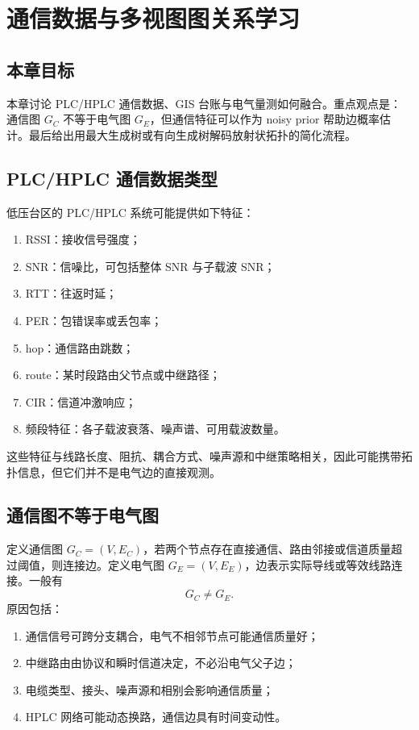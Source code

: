 \chapter{通信数据与多视图图关系学习}
\label{chap:multiview}

\section*{本章目标}
本章讨论 PLC/HPLC 通信数据、GIS 台账与电气量测如何融合。重点观点是：通信图 $G_C$ 不等于电气图 $G_E$，但通信特征可以作为 noisy prior 帮助边概率估计。最后给出用最大生成树或有向生成树解码放射状拓扑的简化流程。

\section{PLC/HPLC 通信数据类型}

低压台区的 PLC/HPLC 系统可能提供如下特征：
\begin{enumerate}[label=(\arabic*)]
  \item RSSI：接收信号强度；
  \item SNR：信噪比，可包括整体 SNR 与子载波 SNR；
  \item RTT：往返时延；
  \item PER：包错误率或丢包率；
  \item hop：通信路由跳数；
  \item route：某时段路由父节点或中继路径；
  \item CIR：信道冲激响应；
  \item 频段特征：各子载波衰落、噪声谱、可用载波数量。
\end{enumerate}
这些特征与线路长度、阻抗、耦合方式、噪声源和中继策略相关，因此可能携带拓扑信息，但它们并不是电气边的直接观测。

\section{通信图不等于电气图}

定义通信图 $G_C=(V,E_C)$，若两个节点存在直接通信、路由邻接或信道质量超过阈值，则连接边。定义电气图 $G_E=(V,E_E)$，边表示实际导线或等效线路连接。一般有
\begin{equation}
  G_C\ne G_E.
\end{equation}
原因包括：
\begin{enumerate}[label=(\arabic*)]
  \item 通信信号可跨分支耦合，电气不相邻节点可能通信质量好；
  \item 中继路由由协议和瞬时信道决定，不必沿电气父子边；
  \item 电缆类型、接头、噪声源和相别会影响通信质量；
  \item HPLC 网络可能动态换路，通信边具有时间变动性。
\end{enumerate}

